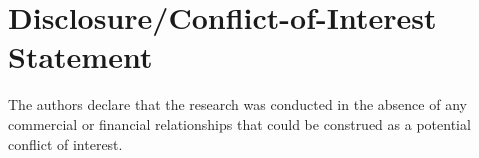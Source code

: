 \documentclass{frontiersSCNS} %
\begin{document}
\section*{Disclosure/Conflict-of-Interest Statement}

The authors declare that the research was conducted in the absence of any commercial or financial relationships that could be construed as a potential conflict of interest.

\end{document}
